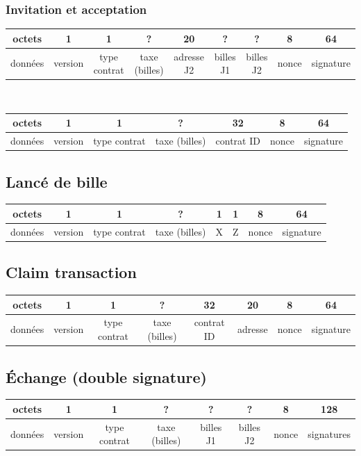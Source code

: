 \documentclass{article}
\begin{document}
\subsubsection{Invitation et acceptation}
\hspace*{-1cm}%
\begin{tabular}{ |c|c|c|c|c|c|c|c|c|} 
 \hline
 octets & 1 & 1 & ? & 20 & ? & ? & 8 & 64\\ 
 \hline
    données & version & type contrat & taxe (billes) & adresse J2 & billes J1 & billes J2 & nonce & signature\\ 
 \hline
\end{tabular}\\ \break

\hspace*{-1cm}%
\begin{tabular}{ |c|c|c|c|c|c|c|} 
 \hline
 octets & 1 & 1 & ? & 32 & 8 & 64\\ 
 \hline
    données & version & type contrat & taxe (billes) & contrat ID & nonce & signature\\ 
 \hline
\end{tabular}

\subsection{Lancé de bille}
\hspace*{-1cm}%
\begin{tabular}{ |c|c|c|c|c|c|c|c|} 
 \hline
 octets & 1 & 1 & ? & 1 & 1 & 8 & 64 \\ 
 \hline
    données & version & type contrat & taxe (billes) & X & Z & nonce & signature\\ 
 \hline
\end{tabular}

\subsection{Claim transaction}
\hspace*{-1cm}%
\begin{tabular}{ |c|c|c|c|c|c|c|c|} 
 \hline
 octets & 1 & 1 & ? & 32 & 20 & 8 & 64 \\ 
 \hline
    données & version & type contrat & taxe (billes) & contrat ID & adresse & nonce & signature\\ 
 \hline
\end{tabular}

\subsection{Échange (double signature)}
\hspace*{-1cm}%
\begin{tabular}{ |c|c|c|c|c|c|c|c|} 
 \hline
 octets & 1 & 1 & ? & ? & ? & 8 & 128\\ 
 \hline
    données & version & type contrat & taxe (billes) & billes J1 & billes J2 & nonce & signatures\\ 
 \hline
\end{tabular}
\end{document}
